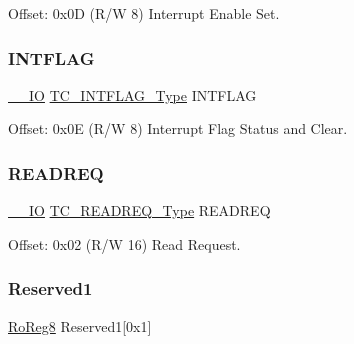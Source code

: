 Offset\+: 0x0D (R/W 8) Interrupt Enable Set. 

\mbox{\label{struct_tc_count32_a076bcac2737bf4d77b94d8ca8362a8f0}} 
\subsubsection{\texorpdfstring{INTFLAG}{INTFLAG}}
{\footnotesize\ttfamily \mbox{\hyperlink{core__cm0plus_8h_aec43007d9998a0a0e01faede4133d6be}{\+\_\+\+\_\+\+IO}} \mbox{\hyperlink{union_t_c___i_n_t_f_l_a_g___type}{T\+C\+\_\+\+I\+N\+T\+F\+L\+A\+G\+\_\+\+Type}} I\+N\+T\+F\+L\+AG}



Offset\+: 0x0E (R/W 8) Interrupt Flag Status and Clear. 

\mbox{\label{struct_tc_count32_a9cb0a3ec797bc9e4a1b1db94d2865b34}} 
\subsubsection{\texorpdfstring{READREQ}{READREQ}}
{\footnotesize\ttfamily \mbox{\hyperlink{core__cm0plus_8h_aec43007d9998a0a0e01faede4133d6be}{\+\_\+\+\_\+\+IO}} \mbox{\hyperlink{union_t_c___r_e_a_d_r_e_q___type}{T\+C\+\_\+\+R\+E\+A\+D\+R\+E\+Q\+\_\+\+Type}} R\+E\+A\+D\+R\+EQ}



Offset\+: 0x02 (R/W 16) Read Request. 

\mbox{\label{struct_tc_count32_a092866123ac46d0985136e4dca2f36f4}} 
\subsubsection{\texorpdfstring{Reserved1}{Reserved1}}
{\footnotesize\ttfamily \mbox{\hyperlink{group___s_a_m_d21_e15_a__definitions_ga0d957f1433aaf5d70e4dc2b68288442d}{Ro\+Reg8}} Reserved1\mbox{[}0x1\mbox{]}}

\mbox{\label{struct_tc_count32_a99ee50bfa44e107c16a546d778dcdcc7}} 

